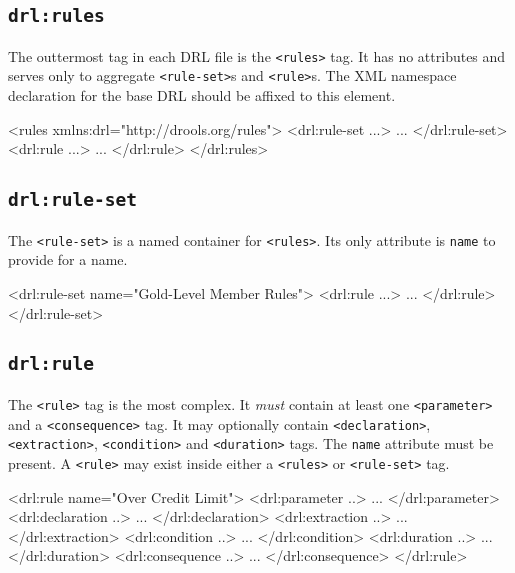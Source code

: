\subsection{\texttt{drl:rules}}

The outtermost tag in each DRL file is the \verb|<rules>| tag.  It has
no attributes and serves only to aggregate \verb|<rule-set>|s and
\verb|<rule>|s. The XML namespace declaration for the base DRL should
be affixed to this element.

\begin{codelisting}
<rules xmlns:drl="http://drools.org/rules">
\textcolor{light}{  <drl:rule-set ...>
    ...
  </drl:rule-set>
  <drl:rule ...>
    ...
  </drl:rule>}
</drl:rules>
\end{codelisting}

\subsection{\texttt{drl:rule-set}}

The \verb|<rule-set>| is a named container for \verb|<rules>|.  Its
only attribute is \verb|name| to provide for a name.  

\begin{codelisting}
<drl:rule-set name="Gold-Level Member Rules">
\textcolor{light}{  <drl:rule ...>
    ...
  </drl:rule>}
</drl:rule-set>
\end{codelisting}

\subsection{\texttt{drl:rule}}

The \verb|<rule>| tag is the most complex.  It \emph{must} contain
at least one \verb|<parameter>| and a \verb|<consequence>| tag.  It
may optionally contain \verb|<declaration>|, \verb|<extraction>|,
\verb|<condition>| and \verb|<duration>| tags.  The \verb|name|
attribute must be present. A \verb|<rule>| may exist inside either 
a \verb|<rules>| or \verb|<rule-set>| tag.

\begin{codelisting}
<drl:rule name="Over Credit Limit">
\textcolor{light}{  <drl:parameter ..>
    ...
  </drl:parameter>
  <drl:declaration ..>
    ...
  </drl:declaration>
  <drl:extraction ..>
    ...
  </drl:extraction>
  <drl:condition ..>
    ...
  </drl:condition>
  <drl:duration ..>
    ...
  </drl:duration>
  <drl:consequence ..>
    ...
  </drl:consequence>}
</drl:rule>
\end{codelisting}

